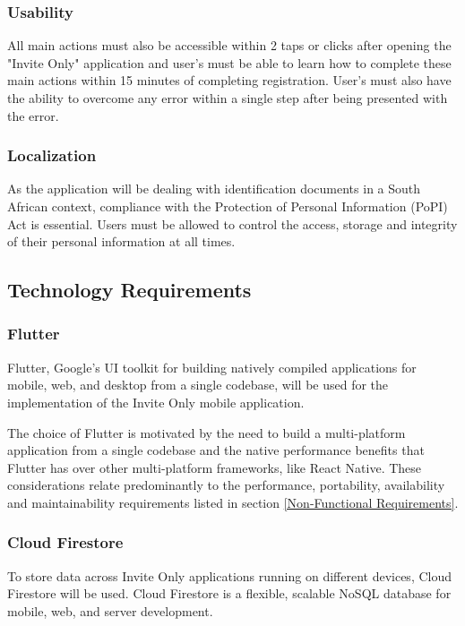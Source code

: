 \newpage

\subsubsection{Usability}
All main actions must also be accessible within 2 taps or clicks after opening the "Invite Only" application and user's must be able to learn how to complete these main actions within 15 minutes of completing registration. User's must also have the ability to overcome any error within a single step after being presented with the error.

\subsubsection{Localization}
As the application will be dealing with identification documents in a South African context, compliance with the Protection of Personal Information (PoPI) Act is essential. Users must be allowed to control the access, storage and integrity of their personal information at all times.

\newpage

\subsection{Technology Requirements} \label{Technology Requirements}

\subsubsection{Flutter}

Flutter, Google’s UI toolkit for building natively compiled applications for mobile, web, and desktop from a single codebase, will be used for the implementation of the Invite Only mobile application. 

The choice of Flutter is motivated by the need to build a multi-platform application from a single codebase and the native performance benefits that Flutter has over other multi-platform frameworks, like React Native. These considerations relate predominantly to the performance, portability, availability and maintainability requirements listed in section \ref{Non-Functional Requirements}.

\subsubsection{Cloud Firestore}

To store data across Invite Only applications running on different devices, Cloud Firestore will be used. Cloud Firestore is a flexible, scalable NoSQL database for mobile, web, and server development.

